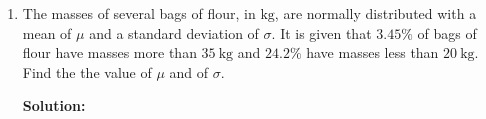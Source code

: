 \documentclass{report}
\newcommand{\sol}{\textbf{Solution:}}
\newcommand\comb[2][^n]{{}_{#1}C_{#2}}
\begin{document}
\begin{enumerate}[leftmargin=*]
\begin{enumerate}
\begin{enumerate}
                              \sol{}

                              The number of teams that can be formed is
                              \begin{align*}
                                  \comb[10]{5} - \comb[4]{0} \times \comb[6]{5} - \comb[4]{1} \times \comb[6]{4} & = 252 - 6 - 60 \\
                                                                                                                 & = 186
                              \end{align*}
                    \end{enumerate}

              \item The masses of several bags of flour, in $\mathrm{kg}$, are normally distributed
                    with a mean of $\mu$ and a standard deviation of $\sigma$. It is given that
                    $3.45 \%$ of bags of flour have masses more than $35 \mathrm{~kg}$ and $24.2
                        \%$ have masses less than $20 \mathrm{~kg}$. Find the the value of $\mu$ and of
                    $\sigma$.

                    \sol{}


\end{enumerate}
\end{enumerate}
\end{document}
